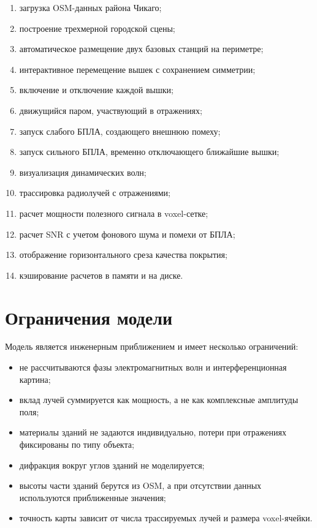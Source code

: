\documentclass[12pt,a4paper]{article}
\begin{document}
\begin{enumerate}
    \item загрузка OSM-данных района Чикаго;
    \item построение трехмерной городской сцены;
    \item автоматическое размещение двух базовых станций на периметре;
    \item интерактивное перемещение вышек с сохранением симметрии;
    \item включение и отключение каждой вышки;
    \item движущийся паром, участвующий в отражениях;
    \item запуск слабого БПЛА, создающего внешнюю помеху;
    \item запуск сильного БПЛА, временно отключающего ближайшие вышки;
    \item визуализация динамических волн;
    \item трассировка радиолучей с отражениями;
    \item расчет мощности полезного сигнала в voxel-сетке;
    \item расчет SNR с учетом фонового шума и помехи от БПЛА;
    \item отображение горизонтального среза качества покрытия;
    \item кэширование расчетов в памяти и на диске.
\end{enumerate}

\section{Ограничения модели}

Модель является инженерным приближением и имеет несколько ограничений:

\begin{itemize}
    \item не рассчитываются фазы электромагнитных волн и интерференционная картина;
    \item вклад лучей суммируется как мощность, а не как комплексные амплитуды поля;
    \item материалы зданий не задаются индивидуально, потери при отражениях фиксированы по типу объекта;
    \item дифракция вокруг углов зданий не моделируется;
    \item высоты части зданий берутся из OSM, а при отсутствии данных используются приближенные значения;
    \item точность карты зависит от числа трассируемых лучей и размера voxel-ячейки.
\end{itemize}
\end{document}
